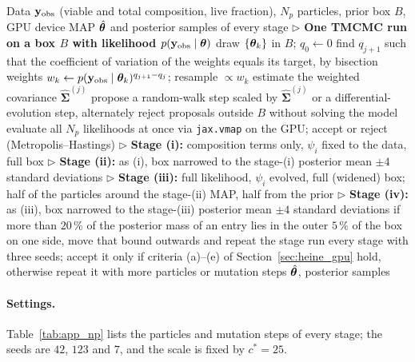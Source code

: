\begin{algorithm}[htbp]
\caption{Four-stage GPU-accelerated TMCMC}
\label{alg:tmcmc}
\begin{algorithmic}[1]
\REQUIRE Data $\mathbf{y}_{\mathrm{obs}}$ (viable and total composition, live fraction), $N_p$ particles, prior box $B$, GPU device
\ENSURE MAP $\hat{\boldsymbol{\theta}}$ and posterior samples of every stage
\STATE $\triangleright$ \textbf{One TMCMC run on a box $B$ with likelihood $p(\mathbf{y}_{\mathrm{obs}}\mid\boldsymbol{\theta})$}
\STATE draw $\{\boldsymbol{\theta}_k\}$ in $B$; $q_0\leftarrow0$
  \STATE find $q_{j+1}$ such that the coefficient of variation of the weights equals its target, by bisection
  \STATE weights $w_k\leftarrow p(\mathbf{y}_{\mathrm{obs}}\mid\boldsymbol{\theta}_k)^{q_{j+1}-q_j}$; resample $\propto w_k$
  \STATE estimate the weighted covariance $\hat{\boldsymbol\Sigma}^{(j)}$
    \STATE propose a random-walk step scaled by $\hat{\boldsymbol\Sigma}^{(j)}$ or a differential-evolution step, alternately
    \STATE reject proposals outside $B$ without solving the model
    \STATE evaluate all $N_p$ likelihoods at once via \texttt{jax.vmap} on the GPU; accept or reject (Metropolis--Hastings)
  \ENDFOR
\ENDWHILE
\STATE $\triangleright$ \textbf{Stage (i):} composition terms only, $\psi_i$ fixed to the data, full box
\STATE $\triangleright$ \textbf{Stage (ii):} as (i), box narrowed to the stage-(i) posterior mean $\pm4$ standard deviations
\STATE $\triangleright$ \textbf{Stage (iii):} full likelihood, $\psi_i$ evolved, full (widened) box; half of the particles around the stage-(ii) MAP, half from the prior
\STATE $\triangleright$ \textbf{Stage (iv):} as (iii), box narrowed to the stage-(iii) posterior mean $\pm4$ standard deviations
\STATE if more than $20\,\%$ of the posterior mass of an entry lies in the outer $5\,\%$ of the box on one side, move that bound outwards and repeat the stage
\STATE run every stage with three seeds; accept it only if criteria (a)--(e) of Section~\ref{sec:heine_gpu} hold, otherwise repeat it with more particles or mutation steps
\RETURN $\hat{\boldsymbol{\theta}}$, posterior samples
\end{algorithmic}
\end{algorithm}

\paragraph{Settings.}
Table~\ref{tab:app_np} lists the particles and mutation steps of every
stage; the seeds are $42$, $123$ and $7$, and the scale is fixed by $c^*=25$.

